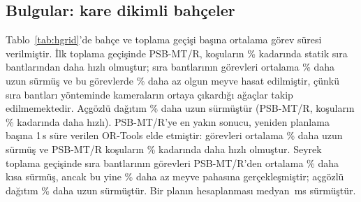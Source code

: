 \subsection{Bulgular: kare dikimli bahçeler}

\begin{table}[t]
\centering
\caption{Kare dikimli bahçeler: beş tohum üzerinden ortalama görev süresi [h]; kalın: her
satırdaki en iyi değer. k-d+TO: uç devralmalı $k$-d bölgeleri}\label{tab:hgrid}
\footnotesize
\setlength{\tabcolsep}{4pt}

\end{table}

\begin{table}[t]
\centering
\caption{Çentikli blokta duyarlılık analizi: PSB-MT/R'nin ortalama görev süresi ve diğer
planlayıcıların göreli farkı (üç tohum)}\label{tab:hgridsens}
\scriptsize
\setlength{\tabcolsep}{3pt}

\end{table}

\begin{table}[t]
\centering
\caption{PSB-MT/R ile referans planlayıcıların kümelenmiş karşılaştırması. Her bahçe--geçiş
kümesinde beş tohumun ortalaması alınmış, ardından kümeler arasında eşleştirilmiş
$t$ güven aralıkları hesaplanmıştır. Farklar PSB-MT/R eksi referanstır; negatif
$\Delta T$ ve pozitif diğer değerler PSB-MT/R lehinedir. yp: yüzde puan;
kesinlik: toplanan olgun meyvenin tüm koparılan meyveye oranı; olgun/saat farkı
göreli verimlilik farkıdır. Köşeli parantezler \%95 güven aralığıdır}\label{tab:harvestquality}
\scriptsize
\setlength{\tabcolsep}{3pt}

\end{table}

Tablo~\ref{tab:hgrid}'de bahçe ve toplama geçişi başına ortalama görev süresi verilmiştir. İlk
toplama geçişinde PSB-MT/R, koşuların \HgFirstRowblockWin\% kadarında statik sıra bantlarından daha
hızlı olmuştur; sıra bantlarının görevleri ortalama \HgFirstRowblockRel\% daha uzun sürmüş ve
bu görevlerde \HgFirstRowblockFruit\% daha az olgun meyve hasat edilmiştir, çünkü sıra bantları yönteminde
kameraların ortaya çıkardığı ağaçlar takip edilmemektedir. Açgözlü dağıtım
\HgFirstGreedyRel\% daha uzun sürmüştür (PSB-MT/R, koşuların \HgFirstGreedyWin\% kadarında daha hızlı). PSB-MT/R'ye
en yakın sonucu, yeniden planlama başına 1\,s süre verilen OR-Tools elde etmiştir: görevleri ortalama \HgOrtoolsOneRel\%
daha uzun sürmüş ve PSB-MT/R koşuların \HgWinOrtoolsOne\% kadarında daha hızlı olmuştur. Seyrek toplama geçişinde sıra bantlarının görevleri
PSB-MT/R'den ortalama \HgSparseRowblockRel\% daha kısa sürmüş, ancak bu yine
\HgSparseRowblockFruit\% daha az meyve pahasına gerçekleşmiştir; açgözlü dağıtım \HgSparseGreedyRel\%
daha uzun sürmüştür. Bir planın hesaplanması medyan \HgPlanMs\,ms sürmüştür.

